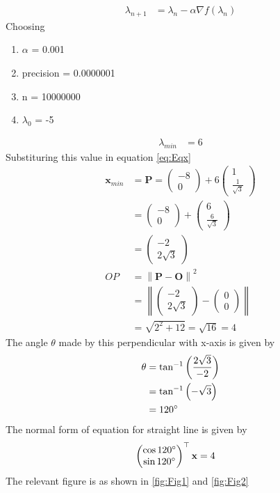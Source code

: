 \documentclass[12pt]{article}
\providecommand{\brak}[1]{\ensuremath{\left(#1\right)}}
\providecommand{\norm}[1]{\left\lVert#1\right\rVert}
\newcommand{\myvec}[1]{\ensuremath{\begin{pmatrix}#1\end{pmatrix}}}
\let\vec\mathbf
\begin{document}
\begin{enumerate}
\begin{align}
	\label{eq:grad_des}
	\lambda_{n+1} &= \lambda_n - \alpha \nabla f\brak{\lambda_n}
\end{align}
Choosing
\begin{enumerate}
 \item $\alpha$ = 0.001
 \item precision = 0.0000001
 \item n = 10000000 
 \item $\lambda_0$ = -5 
\end{enumerate}
\begin{align}
	\lambda_{min} &= 6 
\end{align}
Substituring this value in equation \eqref{eq:Eqx}
\begin{align}
	\vec{x}_{min} &= \vec{P} = \myvec{-8 \\ 0}+6\myvec{1 \\ \frac{1}{\sqrt{3}}}  \\
	&= \myvec{-8 \\ 0}+\myvec{6 \\ \frac{6}{\sqrt{3}}} \\
	&= \myvec{-2 \\ 2\sqrt{3}} \\
	OP &= \norm{\vec{P}-\vec{O}}^2 \\ 
	&= \norm{\myvec{-2 \\ 2\sqrt{3}}-\myvec{0 \\ 0}} \\
	&= \sqrt{2^2 + 12} = \sqrt{16} = 4
\end{align}
The angle $\theta$ made by this perpendicular with x-axis is given by
\begin{align}
         \theta &= \tan^{-1}\brak{\frac{2\sqrt{3}}{-2}} \\
	 &= \tan^{-1}\brak{-\sqrt{3}} \\
	 &= 120\degree
\end{align}
The normal form of equation for straight line is given by
\begin{align}
	\myvec{\cos120\degree \\ \sin120\degree}^\top\vec{x} &= 4 
\end{align}
The relevant figure is as shown in \ref{fig:Fig1} and \ref{fig:Fig2}
\begin{figure}[!h]
	\begin{center}

\end{center}
\end{figure}
\end{enumerate}
\end{document}

